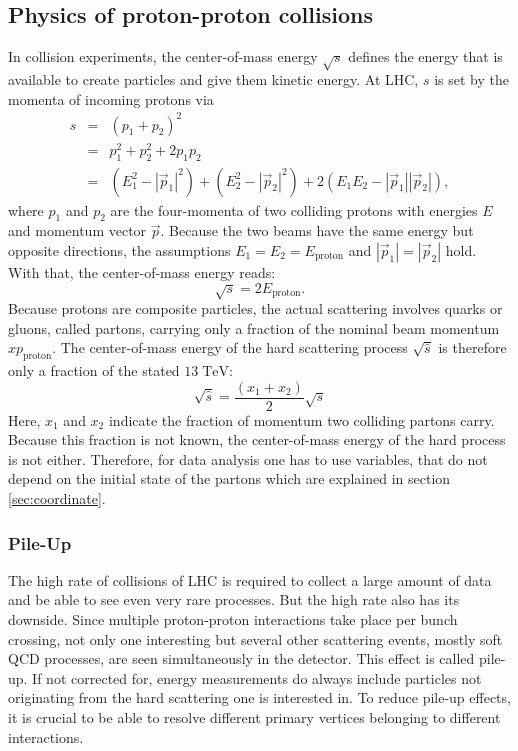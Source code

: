 \subsection{Physics of proton-proton collisions}
	In collision experiments, the center-of-mass energy $\sqrt{s}$ defines the energy that is available to create particles and give them kinetic energy. At LHC, $s$ is set by the momenta of incoming protons via
	\begin{eqnarray}
	s &=& (p_1 + p_2)^2 \\
	  &=& p_1^2 + p_2^2 + 2 p_1 p_2 \\
	  &=& (E_1^2 - |\vec{p}_1|^2 )  + (E_2^2 - |\vec{p}_2|^2 ) + 2 (E_1 E_2 - |\vec{p}_1| |\vec{p}_2| ),
	\end{eqnarray}
	where $p_1$ and $p_2$ are the four-momenta of two colliding protons with energies $E$ and momentum vector $\vec{p}$. Because the two beams have the same energy but opposite directions, the assumptions $E_1 = E_2 = E_\text{proton}$ and $|\vec{p}_1| = |\vec{p}_2|$ hold. With that, the center-of-mass energy reads:
	\begin{equation}
	\sqrt{s} = 2 E_\text{proton}.
	\end{equation}
	Because protons are composite particles, the actual scattering involves quarks or gluons, called partons, carrying only a fraction of the nominal beam momentum $x p_\text{proton}$. The center-of-mass energy of the hard scattering process $\sqrt{\hat{s}}$ is therefore only a fraction of the stated $13\;\text{TeV}$:
	\begin{equation}
	\sqrt{\hat{s}} = \frac{(x_1 + x_2)}{2} \sqrt{s}
	\end{equation} 
	Here, $x_1$ and $x_2$ indicate the fraction of momentum two colliding partons carry. Because this fraction is not known, the center-of-mass energy of the hard process is not either. Therefore, for data analysis one has to use variables, that do not depend on the initial state of the partons which are explained in section \ref{sec:coordinate}.
	
\subsubsection{Pile-Up}
	The high rate of collisions of LHC is required to collect a large amount of data and be able to see even very rare processes. But the high rate also has its downside. Since multiple proton-proton interactions take place per bunch crossing, not only one interesting but several other scattering events, mostly soft QCD processes, are seen simultaneously in the detector. This effect is called pile-up. If not corrected for, energy measurements do always include particles not originating from the hard scattering one is interested in. To reduce pile-up effects, it is crucial to be able to resolve different primary vertices belonging to different interactions.
